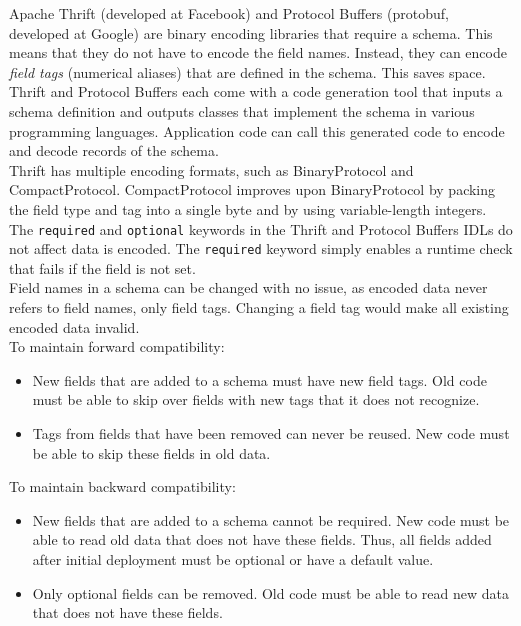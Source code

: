 \documentclass[12pt, titlepage]{article}
\begin{document}
Apache Thrift (developed at Facebook) and Protocol Buffers (protobuf, developed at Google) are binary encoding libraries that require a schema. This means that they do not have to encode the field names. Instead, they can encode \textit{field tags} (numerical aliases) that are defined in the schema. This saves space. \\

Thrift and Protocol Buffers each come with a code generation tool that inputs a schema definition and outputs classes that implement the schema in various programming languages. Application code can call this generated code to encode and decode records of the schema. \\

Thrift has multiple encoding formats, such as BinaryProtocol and CompactProtocol. CompactProtocol improves upon BinaryProtocol by packing the field type and tag into a single byte and by using variable-length integers. \\

The \texttt{required} and \texttt{optional} keywords in the Thrift and Protocol Buffers IDLs do not affect data is encoded. The \texttt{required} keyword simply enables a runtime check that fails if the field is not set. \\

Field names in a schema can be changed with no issue, as encoded data never refers to field names, only field tags. Changing a field tag would make all existing encoded data invalid. \\

To maintain forward compatibility:
\begin{itemize}
    \item New fields that are added to a schema must have new field tags. Old code must be able to skip over fields with new tags that it does not recognize.
    \item Tags from fields that have been removed can never be reused. New code must be able to skip these fields in old data.
\end{itemize}

To maintain backward compatibility:
\begin{itemize}
    \item New fields that are added to a schema cannot be required. New code must be able to read old data that does not have these fields. Thus, all fields added after initial deployment must be optional or have a default value.
    \item Only optional fields can be removed. Old code must be able to read new data that does not have these fields.
\end{itemize}
\end{document}
